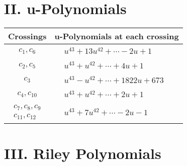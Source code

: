 \documentclass[1p]{elsarticle_modified}
\theoremstyle{definition}
\begin{document}
\newpage\renewcommand{\arraystretch}{1}
\centering \section*{ II. u-Polynomials}
\begin{tabular}{m{50pt}|m{274pt}}
Crossings & \hspace{64pt}u-Polynomials at each crossing \\
\hline $$\begin{aligned}c_{1},c_{6}\end{aligned}$$&$\begin{aligned}
&u^{43}+13 u^{42}+\cdots-2 u+1
\end{aligned}$\\
\hline $$\begin{aligned}c_{2},c_{5}\end{aligned}$$&$\begin{aligned}
&u^{43}+u^{42}+\cdots+4 u+1
\end{aligned}$\\
\hline $$\begin{aligned}c_{3}\end{aligned}$$&$\begin{aligned}
&u^{43}- u^{42}+\cdots+1822 u+673
\end{aligned}$\\
\hline $$\begin{aligned}c_{4},c_{10}\end{aligned}$$&$\begin{aligned}
&u^{43}+u^{42}+\cdots+2 u+1
\end{aligned}$\\
\hline $$\begin{aligned}c_{7},c_{8},c_{9}\\c_{11},c_{12}\end{aligned}$$&$\begin{aligned}
&u^{43}+7 u^{42}+\cdots-2 u-1
\end{aligned}$\\
\hline
\end{tabular}\newpage\renewcommand{\arraystretch}{1}
\centering \section*{ III. Riley Polynomials}
\end{document}
